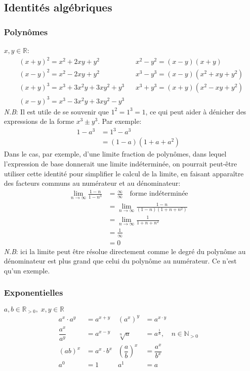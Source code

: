 \documentclass{article}
\begin{document}
\subsection{Identités algébriques}
\subsubsection{Polynômes} 
\(x,y \in \mathbb{R}\):
\begin{align*}
	&(x+y)^2 = x^2 + 2xy + y^2 				& 	&x^2 - y^2 = (x - y)(x + y) \\
	&(x-y)^2 = x^2 - 2xy + y^2 					& 	&x^3 - y^3 = (x - y)(x^2 + xy + y^2) \\
	&(x+y)^3 = x^3 + 3x^2y + 3xy^2 + y^3 	& 	&x^3 + y^3 = (x + y)(x^2 - xy + y^2) \\
	&(x-y)^3 = x^3 - 3x^2y + 3xy^2 - y^3 
\end{align*}
\emph{N.B}: Il est utile de se souvenir que \(1^2 = 1^3 = 1\), ce qui peut aider à dénicher des expressions de la forme \(x^3 \pm y^3\). Par exemple:
\vspace{-0.2cm}
\begin{align*}
	1 - a^3 	&= 1^3 - a^3 \\
				&= (1-a)(1+a+a^2)
\end{align*}
Dans le cas, par exemple, d'une limite fraction de polynômes, dans lequel l'expression de base donnerait une limite indéterminée, on pourrait peut-être utiliser cette identité pour simplifier le calcul de la limite, en faisant apparaître des facteurs communs au numérateur et au dénominateur:
\begin{align*}
	\lim_{n \to \infty} \frac{1 - n}{1 - n^3} &= \frac{\infty}{\infty} \quad \text{forme indéterminée} \\
	&= \lim_{n \to \infty} \frac{1 - n}{(1 - n)(1 + n + n^2)} \\
	&= \lim_{n \to \infty} \frac{1}{1 + n + n^2} \\
	&= \frac{1}{\infty} \\
	&= 0
\end{align*}
\emph{N.B}: ici la limite peut être résolue directement comme le degré du polynôme au dénominateur est plus grand que celui du polynôme au numérateur. Ce n'est qu'un exemple.

\subsubsection{Exponentielles}
\(a, b \in \mathbb{R}_{>0}, \; x, y \in \mathbb{R}\)
\begin{align*}
	a^x \cdot a^y 		&= a^{x+y} 			&	(a^x)^y 							&= a^{x \cdot y} \\
	\dfrac{a^x}{a^y} 	&= a^{x-y}  			&	\sqrt[n]{a}						&= a^{\frac{1}{n}}, \quad n \in \mathbb{N}_{>0} \\
	(ab)^x 				&= a^x \cdot b^x 	&	\left (\dfrac{a}{b} \right )^x 	&= \dfrac{a^x}{b^x} \\
	a^0 					&= 1 					& 	a^1 								&= a
\end{align*}
\end{document}
